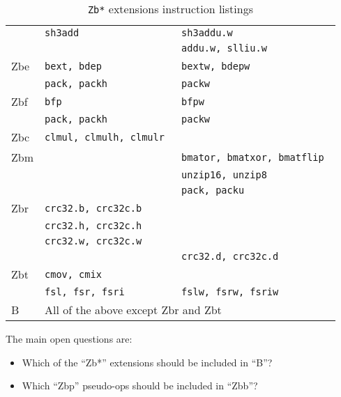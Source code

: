 \begin{table}[!h]
\begin{center}
\begin{tabular}{lll}
 & {\tt sh3add                    } & {\tt sh3addu.w                 } \\
 & {\tt                           } & {\tt addu.w, slliu.w           } \\
\hline
Zbe
 & {\tt bext, bdep                } & {\tt bextw, bdepw              } \\
 & {\tt pack, packh               } & {\tt packw                     } \\
\hline
Zbf
 & {\tt bfp                       } & {\tt bfpw                      } \\
 & {\tt pack, packh               } & {\tt packw                     } \\
\hline
Zbc
 & {\tt clmul, clmulh, clmulr     } & {\tt                           } \\
\hline
Zbm
 & {\tt                           } & {\tt bmator, bmatxor, bmatflip } \\
 & {\tt                           } & {\tt unzip16, unzip8           } \\
 & {\tt                           } & {\tt pack, packu               } \\
\hline
Zbr
 & {\tt crc32.b, crc32c.b         } & {\tt                           } \\
 & {\tt crc32.h, crc32c.h         } & {\tt                           } \\
 & {\tt crc32.w, crc32c.w         } & {\tt                           } \\
 & {\tt                           } & {\tt crc32.d, crc32c.d         } \\
\hline
Zbt
 & {\tt cmov, cmix                } & {\tt                           } \\
 & {\tt fsl, fsr, fsri            } & {\tt fslw, fsrw, fsriw         } \\
\hline
B
 & \multicolumn{2}{l}{All of the above except Zbr and Zbt} \\
\end{tabular}
\caption{{\tt Zb*} extensions instruction listings}
\end{center}
\label{zbexts}
\end{table}

The main open questions are:
\begin{itemize}
\item Which of the ``Zb*'' extensions should be included in ``B''?
\item Which ``Zbp'' pseudo-ops should be included in ``Zbb''?
\end{itemize}

